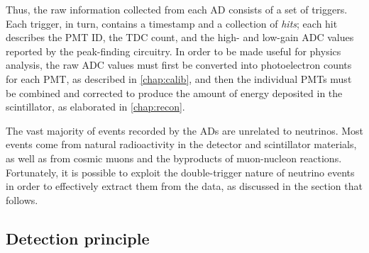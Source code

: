 \documentclass[../thesis.tex]{subfiles}
\begin{document}
Thus, the raw information collected from each AD consists of a set of
triggers. Each trigger, in turn, contains a timestamp and a collection of
\emph{hits}; each hit describes the PMT ID, the TDC count, and the high- and
low-gain ADC values reported by the peak-finding circuitry. In order to be made
useful for physics analysis, the raw ADC values must first be converted into
photoelectron counts for each PMT, as described in \autoref{chap:calib}, and
then the individual PMTs must be combined and corrected to produce the amount of
energy deposited in the scintillator, as elaborated in \autoref{chap:recon}.

The vast majority of events recorded by the ADs are unrelated to neutrinos. Most
events come from natural radioactivity in the detector and scintillator
materials, as well as from cosmic muons and the byproducts of muon-nucleon
reactions. Fortunately, it is possible to exploit the double-trigger nature of
neutrino events in order to effectively extract them from the data, as discussed
in the section that follows.

\subsection{Detection principle}
\label{sec:expDetPrinc}
\end{document}
